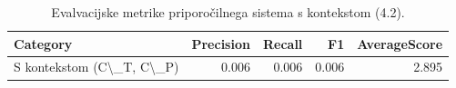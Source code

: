 \begin{table}[h]
\centering
\caption{Evalvacijske metrike priporočilnega sistema s kontekstom (4.2).}
\label{tab:evaluation_metrics_4_2}
\begin{tabular}{lrrrr}
\toprule
Category & Precision & Recall & F1 & AverageScore \\
\midrule
S kontekstom (C\textbackslash \_T, C\textbackslash \_P) & 0.006 & 0.006 & 0.006 & 2.895 \\
\bottomrule
\end{tabular}

\end{table}

